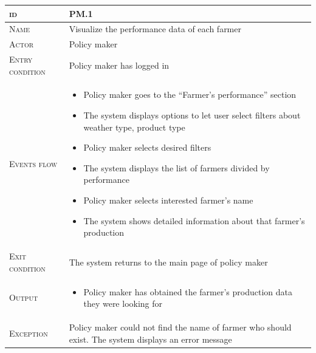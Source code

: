 

\begin{table}[H]
    \centering
    \begin{tabular}{|l|p{}|}
        \hline %
    	\textsc{id}                 &   PM.1\\
    	\hline %
    	\textsc{Name}               &   Visualize the performance data of each farmer\\
    	\hline %
    	\textsc{Actor}             &   Policy maker\\
    	\hline %
    	\textsc{Entry condition}   &   Policy maker has logged in\\
    	\hline %
    	\textsc{Events flow}         &   %
            	                        \begin{itemize}
                                    	    \item Policy maker goes to the “Farmer’s performance” section
                                    	    \item The system displays options to let user select filters about weather type, product type
                                    		\item Policy maker selects desired filters
                                    		\item The system displays the list of farmers divided by performance
                                    		\item Policy maker selects interested farmer’s name
                                    		\item The system shows detailed information about that farmer’s production
                                        \end{itemize}\\
        \hline %
        \textsc{Exit condition}    &  The system returns to the main page of policy maker\\
    	\hline %
    	\textsc{Output}             &  \begin{itemize}
    	    \item Policy maker has obtained the farmer's production data they were looking for
    	\end{itemize}\\
    	\hline %
    	\textsc{Exception}         &  Policy maker could not find the name of farmer who should exist. The system displays an error message\\
    	\hline %
        

\end{tabular}
\end{table}
